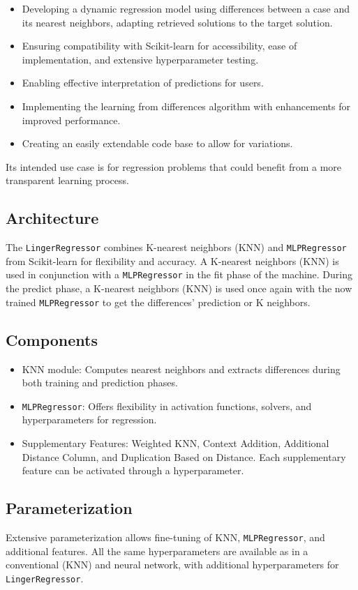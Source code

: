 \documentclass[a4paper, 12pt]{report}
\begin{document}
\begin{itemize}
    \item Developing a dynamic regression model using differences between a case and its nearest neighbors, adapting retrieved solutions to the target solution.
    \item Ensuring compatibility with Scikit-learn for accessibility, ease of implementation, and extensive hyperparameter testing.
    \item Enabling effective interpretation of predictions for users.
    \item Implementing the learning from differences algorithm with enhancements for improved performance.
    \item Creating an easily extendable code base to allow for variations.
\end{itemize}

Its intended use case is for regression problems that could benefit from a more transparent learning process.

\subsection{Architecture}
The \texttt{LingerRegressor} combines K-nearest neighbors (KNN) and \texttt{MLPRegressor} from Scikit-learn for flexibility and accuracy. A K-nearest neighbors (KNN) is used in conjunction with a \texttt{MLPRegressor} in the fit phase of the machine. 
During the predict phase, a K-nearest neighbors (KNN) is used once again with the now trained \texttt{MLPRegressor} to get the differences' prediction or K neighbors.

\subsection{Components}
\begin{itemize}
    \item KNN module: Computes nearest neighbors and extracts differences during both training and prediction phases.
    \item \texttt{MLPRegressor}: Offers flexibility in activation functions, solvers, and hyperparameters for regression.
    \item Supplementary Features: Weighted KNN, Context Addition, Additional Distance Column, and Duplication Based on Distance.
     Each supplementary feature can be activated through a hyperparameter.
\end{itemize}

\subsection{Parameterization}
Extensive parameterization allows fine-tuning of KNN, \texttt{MLPRegressor}, and additional features. 
All the same hyperparameters are available as in a conventional (KNN) and neural network, with additional hyperparameters for \texttt{LingerRegressor}.
\end{document}
